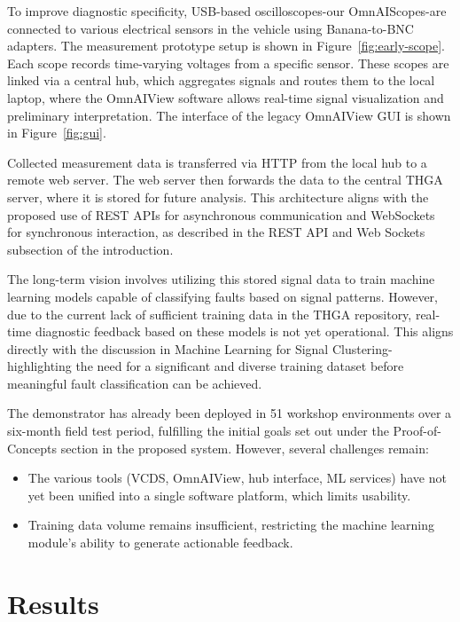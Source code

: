 To improve diagnostic specificity, USB-based oscilloscopes-our OmnAIScopes-are connected to various electrical sensors in the vehicle using Banana-to-BNC adapters. 
The measurement prototype setup is shown in Figure~\ref{fig:early-scope}.
Each scope records time-varying voltages from a specific sensor. 
These scopes are linked via a central hub, which aggregates signals and routes them to the local laptop, where the OmnAIView software allows real-time signal visualization and preliminary interpretation.
The interface of the legacy OmnAIView GUI is shown in Figure~\ref{fig:gui}.

Collected measurement data is transferred via HTTP from the local hub to a remote web server. 
The web server then forwards the data to the central THGA server, where it is stored for future analysis. 
This architecture aligns with the proposed use of REST APIs for asynchronous communication and WebSockets for synchronous interaction, as described in the REST API and Web Sockets subsection of the introduction.

The long-term vision involves utilizing this stored signal data to train machine learning models capable of classifying faults based on signal patterns. 
However, due to the current lack of sufficient training data in the THGA repository, real-time diagnostic feedback based on these models is not yet operational. 
This aligns directly with the discussion in Machine Learning for Signal Clustering-highlighting the need for a significant and diverse training dataset before meaningful fault classification can be achieved.

The demonstrator has already been deployed in 51 workshop environments over a six-month field test period, 
fulfilling the initial goals set out under the Proof-of-Concepts section in the proposed system. 
However, several challenges remain:
\begin{itemize}
  \item The various tools (VCDS, OmnAIView, hub interface, ML services) have not yet been unified into a single software platform, which limits usability.
  \item Training data volume remains insufficient, restricting the machine learning module’s ability to generate actionable feedback.
\end{itemize}



\section{Results}
